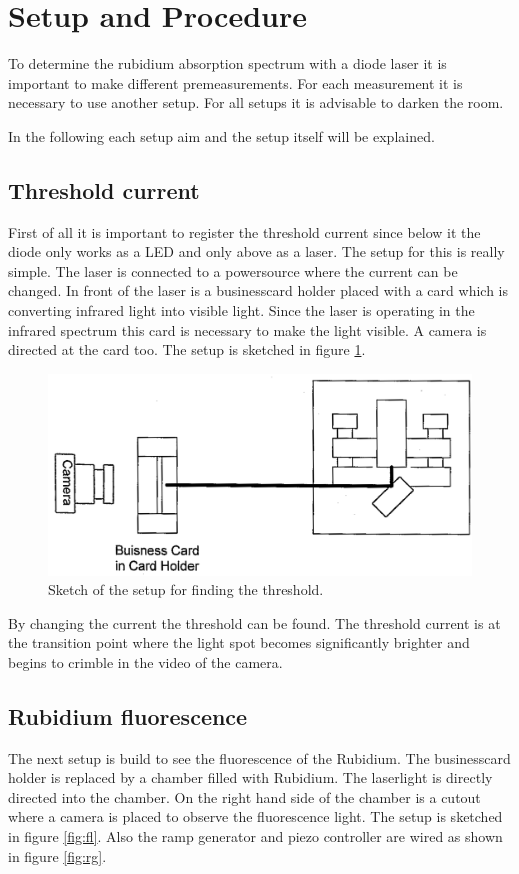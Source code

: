 \section{Setup and Procedure}
To determine the rubidium absorption spectrum with a diode laser it is important to make different premeasurements.
For each measurement it is necessary to use another setup. For all setups it is advisable to darken the room.

\noindent
In the following each setup aim and the setup itself will be explained.

\subsection{Threshold current}
First of all it is important to register the threshold current since below it the diode only works as a LED and 
only above as a laser.
The setup for this is really simple. The laser is connected to a powersource where the current can be changed. 
In front of the laser is a businesscard holder placed with a card which is converting infrared light into 
visible light. 
Since the laser is operating in the infrared spectrum this card is necessary to make the light visible.
A camera is directed at the card too. The setup is sketched in figure \ref{fig:th}.

\begin{figure}[H]
	\centering
	\includegraphics[width=\textwidth]{setup_threshold.png}
	\caption{Sketch of the setup for finding the threshold. \cite{V60}}
	\label{fig:th}
\end{figure}

\noindent
By changing the current the threshold can be found. The threshold current is at the transition point where the light spot
becomes significantly brighter and begins to crimble in the video of the camera.

\subsection{Rubidium fluorescence}
The next setup is build to see the fluorescence of the Rubidium. The businesscard holder is replaced by a chamber
filled with Rubidium. 
The laserlight is directly directed into the chamber. On the right hand side of the chamber is a cutout where
a camera is placed to observe the fluorescence light. The setup is sketched in figure \ref{fig:fl}. Also
 the ramp generator and piezo controller are wired as shown in figure \ref{fig:rg}.

